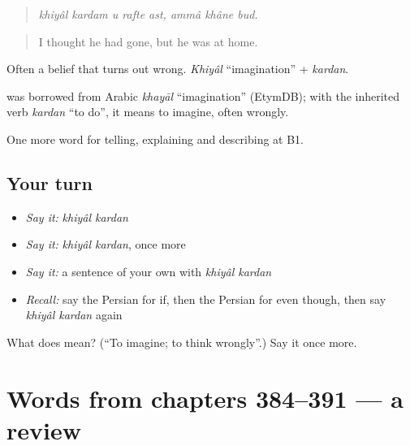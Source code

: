 \begin{quote}
\emph{khiyâl kardam u rafte ast, ammâ khâne bud.}
\end{quote}

\begin{quote}
I thought he had gone, but he was at home.
\end{quote}

Often a belief that turns out wrong. \emph{Khiyâl} \textquotedblleft{}imagination\textquotedblright{} + \emph{kardan}.

\begin{cousinweb}
\textbf{} was borrowed from Arabic \emph{khayāl} \textquotedblleft{}imagination\textquotedblright{} (EtymDB); with the inherited verb \emph{kardan} \textquotedblleft{}to do\textquotedblright{}, it means to imagine, often wrongly.
\end{cousinweb}

\begin{grammarlens}[title={What you've built}]
One more word for telling, explaining and describing at B1.
\end{grammarlens}

\subsection*{Your turn}
\begin{itemize}
\raggedright
  \item \emph{Say it:} \emph{khiyâl kardan}
  \item \emph{Say it:} \emph{khiyâl kardan}, once more
  \item \emph{Say it:} a sentence of your own with \emph{khiyâl kardan}
  \item \emph{Recall:} say the Persian for if, then the Persian for even though, then say \emph{khiyâl kardan} again
\end{itemize}

\begin{tcolorbox}[breakable,colback=teal!4,colframe=teal!35!black,title={Before you move on}]
What does   mean? (\textquotedblleft{}To imagine; to think wrongly\textquotedblright{}.) Say it once more.
\end{tcolorbox}
\section[(dialogue)]{Words from chapters 384–391 — a review}

\label{lesson:FA-R391-review-384-391}



